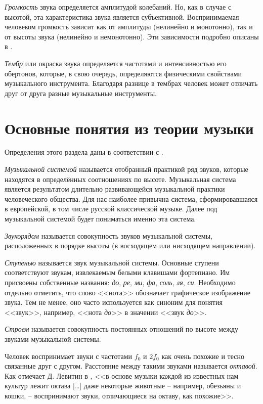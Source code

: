 \emph{Громкость} звука определяется амплитудой колебаний. Но, как в случае с
высотой, эта характеристика звука является субъективной. Воспринимаемая
человеком громкость зависит как от амплитуды (нелинейно и монотонно), так и от
высоты звука (нелинейно и немонотонно). Эти зависимости подробно описаны в
\cite{Fastl2007}.

\emph{Тембр} или окраска звука определяется частотами и интенсивностью его
обертонов, которые, в свою очередь, определяются физическими свойствами
музыкального инструмента. Благодаря разнице в тембрах человек может отличать
друг от друга разные музыкальные инструменты.

\section{Основные понятия из теории музыки} \label{sectT_music}

Определения этого раздела даны в соответствии с \cite{Sposobin2012}.

\emph{Музыкальной системой} называется отобранный практикой ряд звуков, которые
находятся в определённых соотношениях по высоте. Музыкальная система является
результатом длительно развивающейся музыкальной практики человеческого общества.
Для нас наиболее привычна система, сформировавшаяся в европейской, в том числе
русской классической музыке. Далее под музыкальной системой будет пониматься
именно эта система.

\emph{Звукорядом} называется совокупность звуков музыкальной системы,
расположенных в порядке высоты (в восходящем или нисходящем направлении).

\emph{Ступенью} называется звук музыкальной системы. Основные ступени
соответствуют звукам, извлекаемым белыми клавишами фортепиано. Им присвоены
собственные названия: \emph{до}, \emph{ре}, \emph{ми}, \emph{фа}, \emph{соль},
\emph{ля}, \emph{си}. Необходимо отдельно отметить, что слово <<нота>>
обозначает графическое изображение звука. Тем не менее, оно часто используется
как синоним для понятия <<звук>>, например, <<нота \emph{до}>> в значении
<<звук \emph{до}>>.

\emph{Строем} называется совокупность постоянных отношений по высоте между
звуками музыкальной системы.

Человек воспринимает звуки с частотами $f_0$ и $2f_0$ как очень похожие и тесно
связанные друг с другом. Расстояние между такими звуками называется
\emph{октавой}. Как отмечает Д. Левитин в \cite{Levitin2006}, <<в основе
музыки каждой из известных нам культур лежит октава [\ldots] даже некоторые
животные -- например, обезьяны и кошки, -- воспринимают звуки, отличающиеся
на октаву, как похожие>>.

